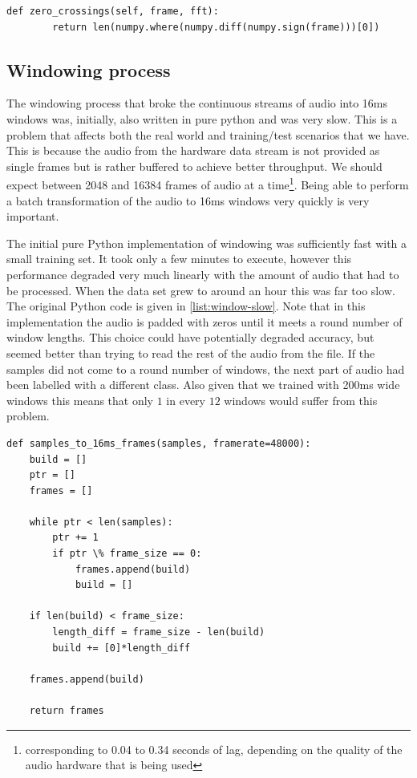 \documentclass[ %
                    author={Sam Phippen},
                supervisor={Dr. Rafal Bogacz},
                     title={Real time voice activity detectors in noisy personal computing environments},
                  subtitle={},
                    degree={MEng},
                      year={2012} ]{thesis}
\begin{document}
\begin{lstlisting}[frame=single,caption=Numpy fast zero crossing rate implementation, label=list:zcr-fast]
    def zero_crossings(self, frame, fft):
        return len(numpy.where(numpy.diff(numpy.sign(frame)))[0])
\end{lstlisting}

\subsection{Windowing process}

The windowing process that broke the continuous streams of audio into 16ms
windows was, initially, also written in pure python and was very slow. This is
a problem that affects both the real world and training/test scenarios that we
have. This is because the audio from the hardware data stream is not provided
as single frames but is rather buffered to achieve better throughput. We
should expect between 2048 and 16384 frames of audio at a time\footnote{corresponding to
0.04 to 0.34 seconds of lag, depending on the quality of the audio hardware
that is being used}. Being able to perform a batch transformation of
the audio to 16ms windows very quickly is very important.

The initial pure Python implementation of windowing was sufficiently fast with
a small training set. It took only a few minutes to execute, however this
performance degraded very much linearly with the amount of audio that had to be
processed. When the data set grew to around an hour this was far too slow. The
original Python code is given in \ref{list:window-slow}. Note that in this
implementation the audio is padded with zeros until it meets a round number of
window lengths. This choice could have potentially degraded accuracy, but
seemed better than trying to read the rest of the audio from the file. If the
samples did not come to a round number of windows, the next part of audio had
been labelled with a different class. Also given that we trained with 200ms
wide windows this means that only $1$ in every $12$ windows would suffer from
this problem.


\begin{lstlisting}[frame=single,caption=Original slow windowing implementation, label=list:windowing-slow]
def samples_to_16ms_frames(samples, framerate=48000):
    build = []
    ptr = []
    frames = []

    while ptr < len(samples):
        ptr += 1
        if ptr \% frame_size == 0:
            frames.append(build)
            build = []

    if len(build) < frame_size:
        length_diff = frame_size - len(build)
        build += [0]*length_diff

    frames.append(build)

    return frames

\end{lstlisting}
\end{document}
